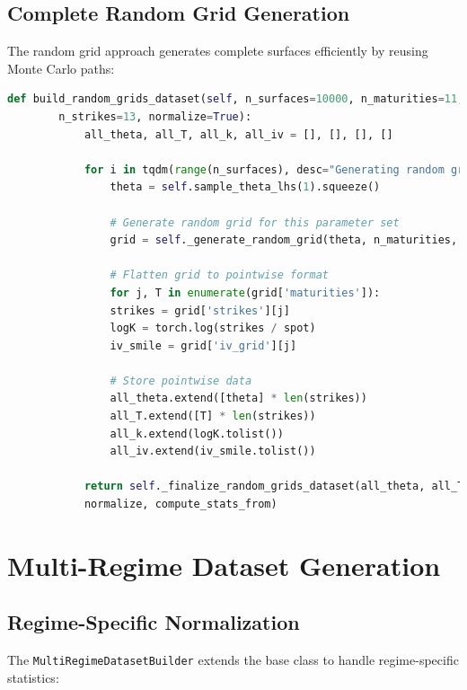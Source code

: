 	\subsection{Complete Random Grid Generation}
	
	The random grid approach generates complete surfaces efficiently by reusing Monte Carlo paths:
	
	\begin{lstlisting}[language=Python, basicstyle=\ttfamily\footnotesize, 
		frame=single, rulecolor=\color{black!20}, backgroundcolor=\color{gray!5},
		showstringspaces=false, breaklines=true, columns=fullflexible]
		def build_random_grids_dataset(self, n_surfaces=10000, n_maturities=11,
		n_strikes=13, normalize=True):
			all_theta, all_T, all_k, all_iv = [], [], [], []
			
			for i in tqdm(range(n_surfaces), desc="Generating random grids"):
				theta = self.sample_theta_lhs(1).squeeze()
			
				# Generate random grid for this parameter set
				grid = self._generate_random_grid(theta, n_maturities, n_strikes)
				
				# Flatten grid to pointwise format
				for j, T in enumerate(grid['maturities']):
				strikes = grid['strikes'][j]
				logK = torch.log(strikes / spot)
				iv_smile = grid['iv_grid'][j]
				
				# Store pointwise data
				all_theta.extend([theta] * len(strikes))
				all_T.extend([T] * len(strikes))
				all_k.extend(logK.tolist())
				all_iv.extend(iv_smile.tolist())
			
			return self._finalize_random_grids_dataset(all_theta, all_T, all_k, all_iv,
			normalize, compute_stats_from)
	\end{lstlisting}
	
	\section{Multi-Regime Dataset Generation}
	
	\subsection{Regime-Specific Normalization}
	
	The \texttt{MultiRegimeDatasetBuilder} extends the base class to handle regime-specific statistics:
	
